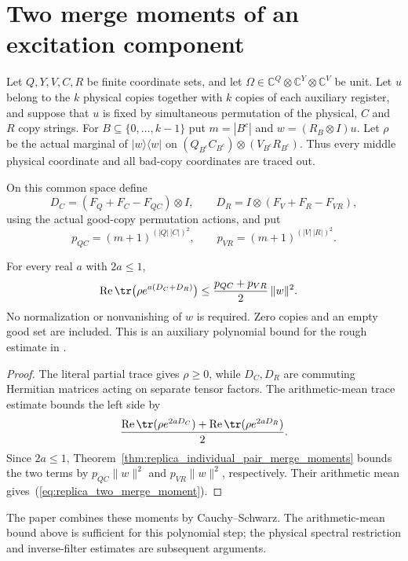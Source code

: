 \section{Two merge moments of an excitation component}
\label{sec:replica_two_merge_moment}

Let $Q,Y,V,C,R$ be finite coordinate sets, and let
$\Omega\in\mathbb C^Q\otimes\mathbb C^Y\otimes\mathbb C^V$ be unit.
Let $u$ belong to the $k$ physical copies together with $k$ copies of each
auxiliary register, and suppose that $u$ is fixed by simultaneous permutation
of the physical, $C$ and $R$ copy strings.
For $B\subseteq\{0,\ldots,k-1\}$ put $m=|B^c|$ and
$w=(R_B\otimes I)u$.
Let $\rho$ be the actual marginal of $|w\rangle\langle w|$ on
$(Q_{B^c}C_{B^c})\otimes(V_{B^c}R_{B^c})$.
Thus every middle physical coordinate and all bad-copy coordinates are traced out.

On this common space define
\[
 D_C=(F_Q+F_C-F_{QC})\otimes I,
 \qquad D_R=I\otimes(F_V+F_R-F_{VR}),
\]
using the actual good-copy permutation actions, and put
\[
 p_{QC}=(m+1)^{(|Q|\,|C|)^2},
 \qquad p_{VR}=(m+1)^{(|V|\,|R|)^2}.
\]

\begin{theorem}
\label{thm:replica_two_merge_moment}
\leanok
{}
For every real $a$ with $2a\leq1$,
\begin{align}
 \operatorname{Re}\tr\bigl(\rho e^{a(D_C+D_R)}\bigr)
 &\leq \frac{p_{QC}+p_{VR}}{2}\,\|w\|^2.
 \label{eq:replica_two_merge_moment}
\end{align}
No normalization or nonvanishing of $w$ is required. Zero copies and an
empty good set are included.
This is an auxiliary polynomial bound for the rough estimate in
\cite[Section~8]{OpenAI2026AreaLaw}.
\end{theorem}

\begin{proof}\leanok
{}
The literal partial trace gives $\rho\geq0$, while $D_C,D_R$ are commuting
Hermitian matrices acting on separate tensor factors. The arithmetic-mean
trace estimate bounds the left side by
\[
 \frac{\operatorname{Re}\tr(\rho e^{2aD_C})
       +\operatorname{Re}\tr(\rho e^{2aD_R})}{2}.
\]
Since $2a\leq1$, Theorem~\ref{thm:replica_individual_pair_merge_moments}
bounds the two terms by $p_{QC}\|w\|^2$ and $p_{VR}\|w\|^2$,
respectively. Their arithmetic mean gives~(\ref{eq:replica_two_merge_moment}).
\end{proof}

The paper combines these moments by Cauchy--Schwarz. The arithmetic-mean
bound above is sufficient for this polynomial step; the physical spectral
restriction and inverse-filter estimates are subsequent arguments.
